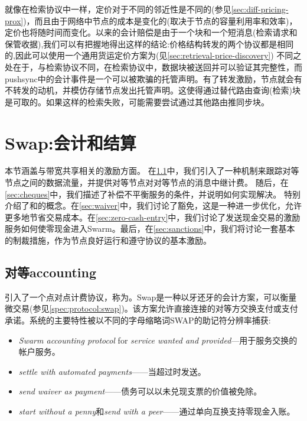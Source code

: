 就像在检索协议中一样，定价对于不同的邻近性是不同的(参见\ref{sec:diff-pricing-prox})，而且由于网络中节点的成本是变化的(取决于节点的容量利用率和效率)，定价也将随时间而变化。以来的会计赔偿是由于一个块和一个短消息(检索请求和保管收据),我们可以有把握地得出这样的结论:价格结构转发的两个协议都是相同的,因此可以使用一个通用货运定价方案为(见\ref{sec:retrieval-price-discovery})
不同之处在于，与检索协议不同，在检索协议中，数据块被送回并可以验证其完整性，而pushsync中的会计事件是一个可以被欺骗的托管声明。有了转发激励，节点就会有不转发的动机，并模仿存储节点发出托管声明。这使得通过替代路由查询(检索)块是可取的。如果这样的检索失败，可能需要尝试通过其他路由推同步块。 
 

\section{Swap:会计和结算}\label{sec:accounting-and-settlement}

\green{}

本节涵盖与带宽共享相关的激励方面。
在\ref{sec:accounting}中，我们引入了一种机制来跟踪对等节点之间的数据流量，并提供对等节点对对等节点的消息中继计费。
随后，在\ref{sec:cheques}中，我们描述了补偿不平衡服务的条件，并说明如何实现解决。
特别介绍了和的概念。在\ref{sec:waiver}中，我们讨论了豁免，这是一种进一步优化，允许更多地节省交易成本。在\ref{sec:zero-cash-entry}中，我们讨论了发送现金交易的激励服务如何使零现金进入Swarm。最后，在\ref{sec:sanctions}中，我们将讨论一套基本的制裁措施，作为节点良好运行和遵守协议的基本激励。

\subsection{对等accounting\statusgreen}\label{sec:accounting}


\cite{ethersphere2016sw3}引入了一个点对点计费协议，称为。Swap是一种以牙还牙的会计方案，可以衡量微交易(参见\ref{spec:protocol:swap})。该方案允许直接连接的对等方交换支付或支付承诺。系统的主要特性被以不同的字母缩略词SWAP的助记符分辨率捕获:

\begin{itemize}
    \item \emph{Swarm accounting protocol} for \emph{service wanted and provided}—用于服务交换的帐户服务。
    \item \emph{settle with automated payments}——当超过时发送。
    \item \emph{send waiver as payment}——债务可以以未兑现支票的价值被免除。 
    \item \emph{start without a penny}和\emph{send with a peer}——通过单向互换支持零现金入账。
\end{itemize}

